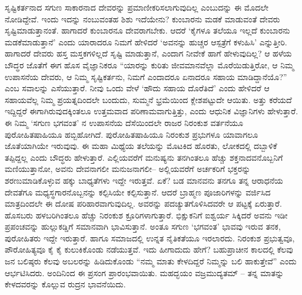 ಸೃಷ್ಟಿಕರ್ತನಾದ ಸಗುಣ ಸಾಕಾರನಾದ ದೇವರನ್ನು ಪ್ರಮಾಣೀಕರಿಸಲಾಗುವುದಿಲ್ಲ ಎಂಬುದನ್ನು ಈ ಮೊದಲೇ ನೋಡಿದ್ದೇವೆ. ಇಂದು ಇದನ್ನು ನಂಬುವಂತಹ ಶಿಶು ಇದೆಯೇನು? ಕುಂಬಾರನು ಮಡಕೆ ಮಾಡುವಂತೆ ದೇವರು ಸೃಷ್ಟಿಮಾಡುತ್ತಾನಂತೆ. ಹಾಗಾದರೆ ಕುಂಬಾರನೂ ದೇವರಾಗಬೇಕು. ಆದರೆ ‘ಕೈಗಳೂ ತಲೆಯೂ ಇಲ್ಲದೆ ಕುಂಬಾರನು ಮಡಕೆಮಾಡುತ್ತಾನೆ’ ಎಂದು ಯಾರಾದರೂ ನಿಮಗೆ ಹೇಳಿದರೆ ‘ಅವನನ್ನು ಹುಚ್ಚರ ಆಸ್ಪತ್ರೆಗೆ ಕಳುಹಿಸಿ’ ಎನ್ನುತ್ತೀರಿ. ಹಾಗಾದರೆ ದೇವರು ಹಸ್ತ ಮಸ್ತಕಗಳಿಲ್ಲದೆ ಸೃಷ್ಟಿ ಮಾಡುತ್ತಾನೆ, ಎಂದಾಗ ನೀವೇಕೆ ಹಾಗೆ ಹೇಳುವುದಿಲ್ಲ? ಆ ಹಳೆಯ ಬೌದ್ಧರ ಜೊತೆಗೆ ಈಗ ಹೊಸ ವೈಜ್ಞಾನಿಕರೂ “ಯಾರನ್ನು ಕುರಿತು ಜೀವಮಾನವೆಲ್ಲಾ ಮೊರೆಯಿಡುತ್ತಿರೋ, ಆ ನಿಮ್ಮ ಉಪಾಸನೆಯ ದೇವರು, ಆ ನಿಮ್ಮ ಸೃಷ್ಟಿಕರ್ತನು, ನಿಮಗೆ ಎಂದಾದರೂ ಏನಾದರೂ ಸಹಾಯ ಮಾಡಿದ್ದಾನೆಯೊ?” ಎಂಬ ಸವಾಲನ್ನು ಎಸೆಯುತ್ತಾರೆ. ನೀವು ಒಂದು ವೇಳೆ ‘ಹೌದು ಸಹಾಯ ದೊರೆತಿದೆ’ ಎಂದು ಹೇಳಿದರೆ ಆ ಸಹಾಯವೆಲ್ಲ ನಿಮ್ಮ ಪ್ರಯತ್ನದಿಂದಲೇ ಬಂದುದು, ಸುಮ್ಮನೆ ಭ್ರಮೆಯಿಂದ ಕ್ಲೇಶಪಟ್ಟುದೇ ಆಯಿತು. ಅತ್ತು ಕರೆಯದೆ ಇದ್ದಿದ್ದರೆ ಈಗಾಗಿರುವುದಕ್ಕಿಂತಲೂ ಉತ್ತಮವಾದ ಪರಿಣಾಮವಾಗುತ್ತಿತ್ತು, ಎಂದು ಆಧುನಿಕ ವಿಜ್ಞಾನಿಗಳು ಹೇಳುತ್ತಾರೆ. ಈ ನಿಮ್ಮ ‘ಸಗುಣ ಭಗವಂತ’ ನ ಉಪಾಸನೆಯ ದೆಸೆಯಿಂದಲೇ ರಾಜರ ನಿರಂಕುಶ ವರ್ತನೆಯೂ ಪುರೋಹಿತಷಾಹಿಯೂ ಹಬ್ಬಿಹೋಗಿದೆ. ಪುರೋಹಿತಷಾಹಿಯೂ ನಿರಂಕುಶ ಪ್ರಭುಗಳೂ ಯಾವಾಗಲೂ ಜೊತೆಯಾಗಿಯೇ ಇರುವುವು. ಈ ಮಹಾ ಮಿಥ್ಯೆಯ ತಲೆಯನ್ನು ಮೊಟಕಿದ ಹೊರತು, ಲೋಕದಲ್ಲಿ ದಬ್ಬಾಳಿಕೆ ತಪ್ಪಿದ್ದಲ್ಲ ಎಂದು ಬೌದ್ಧರು ಹೇಳುತ್ತಾರೆ. ಎಲ್ಲಿಯವರೆಗೆ ಮನುಷ್ಯನು ತನಗಿಂತಲೂ ಹೆಚ್ಚು ಶಕ್ತನಾದವನೊಬ್ಬನಿಗೆ ಮಣಿಯುತ್ತಾನೋ, ಅವನು ದೇವನಾಗಲೀ ಮನುಜನಾಗಲೀ– ಅಲ್ಲಿಯವರೆಗೆ ಅರ್ಚಕರಿಗೆ ಭಕ್ತರನ್ನು ಶರಣುಮಾಡಿಕೊಳ್ಳುವ ಹಕ್ಕು ಬಾಧ್ಯತೆಗಳು ಇದ್ದೇ ಇರುತ್ತವೆ. ಏಕೆ? ಬಡ ಮಾನವನು ತನಗೂ ತನ್ನ ಆರಾಧನೆಯ ದೇವತೆಗೂ ಮಧ್ಯಸ್ಥಗಾರನೊಬ್ಬನನ್ನು ಕಲ್ಪಿಸಿಯೇ ಕಲ್ಪಿಸುತ್ತಾನೆ. ಆದರೆ ಬ್ರಾಹ್ಮಣ ಪೂಜಾರಿಗಳನ್ನು ವರ್ಜಿಸಿದ ಮಾತ್ರದಿಂದಲೇ ಈ ದೋಷ ಪರಿಹಾರವಾಗುವುದಿಲ್ಲ. ಅವರನ್ನು ಪದಚ್ಯುತಗೊಳಿಸಿದವರೇ ಆ ಪಟ್ಟಕ್ಕೆ ಏರುತ್ತಾರೆ. ಹೊಸಬರು ಹಳಬರಿಗಿಂತಲೂ ಹೆಚ್ಚು ನಿರಂಕುಶ ಕ್ರೂರಿಗಳಾಗುತ್ತಾರೆ. ಭಿಕ್ಷುಕನಿಗೆ ಐಶ್ವರ್ಯ ಸಿಕ್ಕಿದರೆ ಅವನು ಇಡೀ ಪ್ರಪಂಚವನ್ನು ಹುಲ್ಲುಕಡ್ಡಿಗೆ ಸಮಾನವಾಗಿ ಭಾವಿಸುತ್ತಾನೆ. ಅಂತೂ ಸಗುಣ ‘ಭಗವಂತ’ ಭಾವವು ಇರುವ ತನಕ, ಪುರೋಹಿತರು ಇದ್ದೇ ಇರುತ್ತಾರೆ. ಹಾಗೂ ಸಮಾಜದಲ್ಲಿ ಉನ್ನತ ನೈತಿಕತೆಯೂ ಇರಲಾರದು. ನಿರಂಕುಶ ಪ್ರಭುತ್ವವೂ, ಪೌರೋಹಿತ್ಯವೂ ಕೈ ಕೈ ಕುಲುಕಿಕೊಂಡು ನಡೆಯುತ್ತವೆ. ಇದು ಹೀಗಾದುದು ಹೇಗೆ? ಬಹುಪ್ರಾಚೀನ ಕಾಲದಲ್ಲಿ ಕೆಲವು ಜನ ಬಲಿಷ್ಠರು ಕೆಲವು ಅಬಲರನ್ನು ಹಿಡಿದುಕೊಂಡು “ನಮ್ಮ ಮಾತು ಕೇಳದಿದ್ದರೆ ನಿಮ್ಮನ್ನು ಬಲಿ ಹಾಕುತ್ತೇವೆ” ಎಂದು ಆರ್ಭಟಿಸಿದರು. ಅಂದಿನಿಂದ ಈ ಪ್ರಸಂಗ ಪ್ರಾರಂಭವಾಯಿತು. ಮಹದ್ಭಯಂ ವಜ್ರಮುದ್ಯತಮ್​ – ತನ್ನ ಮಾತನ್ನು ಕೇಳದವರನ್ನು ಕೊಲ್ಲುವ ರುದ್ರನ ಭಾವನೆಯಿದು.

